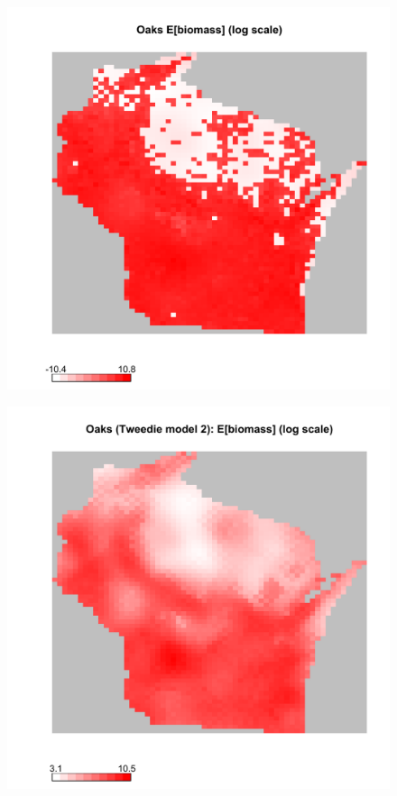 \documentclass[authoryear, review, 11pt]{elsarticle}
\begin{document}
\begin{figure}
	\begin{center}
	\includegraphics[width=5in]{../../figures/Exploration/Oak-Tweedie-E-biomass.pdf}
	\caption{\label{fig:oaks-biomass-observed}}
	\end{center}
\end{figure}

\begin{figure}
	\begin{center}
	\includegraphics[width=5in]{../../figures/Exploration/Oak-Tweedie2-E-biomass.pdf}
	\caption{\label{fig:oaks-biomass-fitted}}
	\end{center}
\end{figure}
\end{document}
